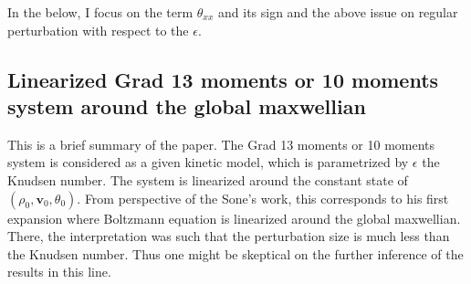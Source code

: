 \documentclass[a4paper,12pt]{article}
\begin{document}
In the below, I focus on the term $\theta_{xx}$ and its sign and the above issue on regular perturbation with respect to the $\epsilon$.


\subsection{Linearized Grad 13 moments or 10 moments system around the global maxwellian}
This is a brief summary of the paper. The Grad 13 moments or 10 moments system is considered as a given kinetic model, which is parametrized by $\epsilon$ the Knudsen number. The system is linearized around the constant state of $(\rho_0,\mathbf{v}_0,\theta_0)$. From perspective of the Sone's work, this corresponds to his first expansion where Boltzmann equation is linearized around the global maxwellian. There, the interpretation was such that the perturbation size is much less than the Knudsen number. Thus one might be skeptical on the further inference of the results in this line.
\end{document}

